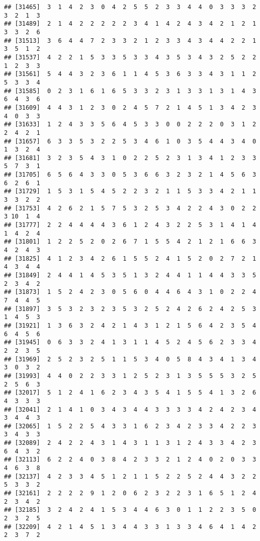 \documentclass[
]{article}
\begin{document}
\begin{verbatim}
## [31465]  3  1  4  2  3  0  4  2  5  5  2  3  3  4  4  0  3  3  3  2  3  2  1  3
## [31489]  2  1  4  2  2  2  2  2  3  4  1  4  2  4  3  4  2  1  2  1  3  3  2  6
## [31513]  3  6  4  4  7  2  3  3  2  1  2  3  3  4  3  4  4  2  2  1  3  5  1  2
## [31537]  4  2  2  1  5  3  3  5  3  3  4  3  5  3  4  3  2  5  2  2  1  2  3  3
## [31561]  5  4  4  3  2  3  6  1  1  4  5  3  6  3  3  4  3  1  1  2  5  3  3  4
## [31585]  0  2  3  1  6  1  6  5  3  3  2  3  1  3  3  1  3  1  4  3  6  4  3  6
## [31609]  4  4  3  1  2  3  0  2  4  5  7  2  1  4  5  1  3  4  2  3  4  0  3  3
## [31633]  1  2  4  3  3  5  6  4  5  3  3  0  0  2  2  2  0  3  1  2  2  4  2  1
## [31657]  6  3  3  5  3  2  2  5  3  4  6  1  0  3  5  4  4  3  4  0  1  3  2  4
## [31681]  3  2  3  5  4  3  1  0  2  2  5  2  3  1  3  4  1  2  3  3  5  7  3  1
## [31705]  6  5  6  4  3  3  0  5  3  6  6  3  2  3  2  1  4  5  6  3  6  2  6  1
## [31729]  1  5  3  1  5  4  5  2  2  3  2  1  1  5  3  3  4  2  1  1  3  3  2  2
## [31753]  4  2  6  2  1  5  7  5  3  2  5  3  4  2  2  4  3  0  2  2  3 10  1  4
## [31777]  2  2  4  4  4  4  3  6  1  2  4  3  2  2  5  3  1  4  1  4  1  4  2  4
## [31801]  1  2  2  5  2  0  2  6  7  1  5  5  4  2  1  2  1  6  6  3  4  2  4  3
## [31825]  4  1  2  3  4  2  6  1  5  5  2  4  1  5  2  0  2  7  2  1  4  3  4  4
## [31849]  2  4  4  1  4  5  3  5  1  3  2  4  4  1  1  4  4  3  3  5  2  3  4  2
## [31873]  1  5  2  4  2  3  0  5  6  0  4  4  6  4  3  1  0  2  2  4  7  4  4  5
## [31897]  3  5  3  2  3  2  3  5  3  2  5  2  4  2  6  2  4  2  5  3  1  4  5  3
## [31921]  1  3  6  3  2  4  2  1  4  3  1  2  1  5  6  4  2  3  5  4  6  4  5  6
## [31945]  0  6  3  3  2  4  1  3  1  1  4  5  2  4  5  6  2  3  3  4  2  2  3  5
## [31969]  2  5  2  3  2  5  1  1  5  3  4  0  5  8  4  3  4  1  3  4  3  0  3  2
## [31993]  4  4  0  2  2  3  3  1  2  5  2  3  1  3  5  5  5  3  2  5  2  5  6  3
## [32017]  5  1  2  4  1  6  2  3  4  3  5  4  1  5  5  4  1  3  2  6  4  3  3  3
## [32041]  2  1  4  1  0  3  4  3  4  4  3  3  3  3  4  2  4  2  3  4  3  4  4  3
## [32065]  1  5  2  2  5  4  3  3  1  6  2  3  4  2  3  3  4  2  2  3  3  4  3  3
## [32089]  2  4  2  2  4  3  1  4  3  1  1  3  1  2  4  3  3  4  2  3  6  4  3  2
## [32113]  6  2  2  4  0  3  8  4  2  3  3  2  1  2  4  0  2  0  3  3  4  6  3  8
## [32137]  4  2  3  3  4  5  1  2  1  1  5  2  2  5  2  4  4  3  2  2  5  3  3  2
## [32161]  2  2  2  2  9  1  2  0  6  2  3  2  2  3  1  6  5  1  2  4  2  3  4  2
## [32185]  3  2  4  2  4  1  5  3  4  4  6  3  0  1  1  2  2  3  5  0  2  3  2  5
## [32209]  4  2  1  4  5  1  3  4  4  3  3  1  3  3  4  6  4  1  4  2  2  3  7  2

\end{verbatim}
\end{document}
